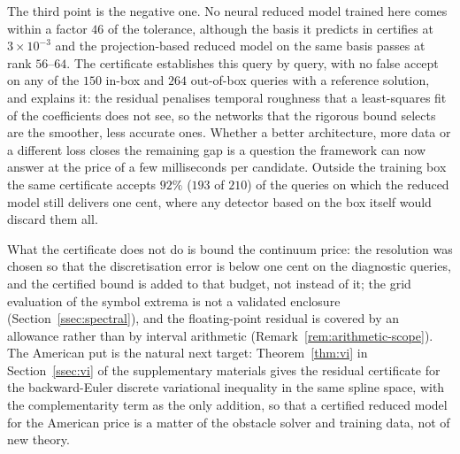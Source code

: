 \documentclass[hidelinks]{siamart251216}
\begin{document}
The third point is the negative one.  No neural reduced model trained here comes within a factor
$46$ of the tolerance, although the basis it predicts in certifies at $3\times10^{-3}$ and the
projection-based reduced model on the same basis passes at rank $56$--$64$.  The certificate
establishes this query by query, with no false accept on any of the $150$ in-box and $264$
out-of-box queries with a reference solution, and explains it: the residual penalises temporal
roughness that a least-squares fit of the coefficients does not see, so the networks that the
rigorous bound selects are the smoother, less accurate ones.  Whether a better architecture, more
data or a different loss closes the remaining gap is a question the framework can now answer at the
price of a few milliseconds per candidate.  Outside the training box the same certificate accepts
$92\%$ ($193$ of $210$) of the queries on which the reduced model still delivers one cent, where
any detector based on the box itself would discard them all.

What the certificate does not do is bound the continuum price: the resolution was chosen so that
the discretisation error is below one cent on the diagnostic queries, and the certified bound is
added to that budget, not instead of it; the grid evaluation of the symbol extrema is not a
validated enclosure (Section~\ref{ssec:spectral}), and the floating-point residual is covered by
an allowance rather than by interval arithmetic (Remark~\ref{rem:arithmetic-scope}).  The American
put is the natural next target: Theorem~\ref{thm:vi} in Section~\ref{ssec:vi} of the supplementary
materials gives the residual certificate for the backward-Euler discrete variational inequality in
the same spline space, with the complementarity term as the only addition, so that a certified
reduced model for the American price is a matter of the obstacle solver and training data, not of
new theory.
\FloatBarrier


\end{document}
